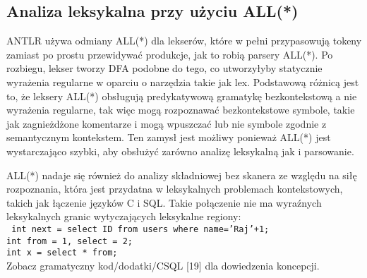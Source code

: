 \subsection{Analiza leksykalna przy użyciu ALL(*)}
ANTLR używa odmiany ALL(*) dla lekserów, które w pełni przypasowują tokeny
zamiast po prostu przewidywać produkcje, jak to robią parsery ALL(*).
Po rozbiegu, lekser tworzy DFA podobne do tego, co utworzyłyby statycznie
wyrażenia regularne w oparciu o narzędzia takie jak lex.
Podstawową różnicą jest to, że leksery ALL(*) obsługują predykatywową gramatykę
bezkontekstową a nie wyrażenia regularne, tak więc mogą rozpoznawać
bezkontekstowe symbole, takie jak zagnieżdżone komentarze i mogą wpuszczać
lub nie symbole zgodnie z semantycznym kontekstem. 
Ten zamysł jest możliwy ponieważ ALL(*) jest wystarczająco szybki, aby
obsłużyć zarówno analizę leksykalną jak i parsowanie.
\par
ALL(*) nadaje się również do analizy składniowej bez skanera ze względu na
siłę rozpoznania, która jest przydatna w leksykalnych problemach kontekstowych,
takich jak łączenie języków C i SQL.
Takie połączenie nie ma wyraźnych leksykalnych granic wytyczających leksykalne regiony: \\
 \texttt{
int next = select ID from users where name='Raj'+1; \\
int from = 1, select = 2; \\
int x = select * from; \\
}
Zobacz gramatyczny kod/dodatki/CSQL [19] dla dowiedzenia koncepcji. 
